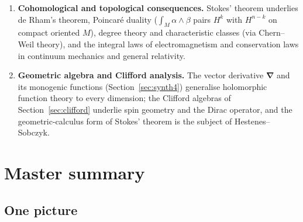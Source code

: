 \documentclass[11pt,a4paper]{article}
\numberwithin{equation}{section}
\theoremstyle{definition}
\theoremstyle{plain}
\newcommand{\vd}{\boldsymbol{\nabla}}               %
\begin{document}
\begin{enumerate}
\item \textbf{Cohomological and topological consequences.} Stokes' theorem underlies de Rham's theorem, Poincar\'e duality ($\int_M\alpha\wedge\beta$ pairs $H^k$ with $H^{n-k}$ on compact oriented $M$), degree theory and characteristic classes (via Chern--Weil theory), and the integral laws of electromagnetism and conservation laws in continuum mechanics and general relativity.
\item \textbf{Geometric algebra and Clifford analysis.} The vector derivative $\vd$ and its monogenic functions (Section~\ref{sec:synth4}) generalise holomorphic function theory to every dimension; the Clifford algebras of Section~\ref{sec:clifford} underlie spin geometry and the Dirac operator, and the geometric-calculus form of Stokes' theorem is the subject of Hestenes--Sobczyk.
\end{enumerate}

\section{Master summary}\label{sec:summary}

\subsection{One picture}
\end{document}
